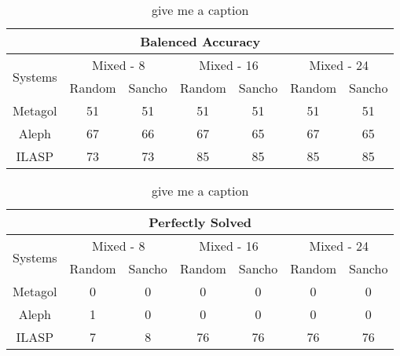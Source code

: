 \begin{table}[]
	\begin{tabular}{|c|c|c|c|c|c|c|}
		\hline
		\multicolumn{7}{|c|}{Balenced Accuracy}                                                                                       \\ \hline
		\multirow{2}{*}{Systems} & \multicolumn{2}{c|}{Mixed - 8} & \multicolumn{2}{c|}{Mixed - 16} & \multicolumn{2}{c|}{Mixed - 24} \\ \cline{2-7}
		& Random         & Sancho        & Random         & Sancho         & Random         & Sancho         \\ \hline
		Metagol                  & 51             & 51            & 51             & 51             & 51             & 51             \\ \hline
		Aleph                    & 67             & 66            & 67             & 65             & 67             & 65             \\ \hline
		ILASP                    & 73             & 73            & 85             & 85             & 85             & 85             \\ \hline
	\end{tabular}
	\label{givemeaname}
	\caption{\ac{give me a caption}}
\end{table}

\begin{table}[]
	\begin{tabular}{|c|c|c|c|c|c|c|}
		\hline
		\multicolumn{7}{|c|}{Perfectly Solved}                                                                                        \\ \hline
		\multirow{2}{*}{Systems} & \multicolumn{2}{c|}{Mixed - 8} & \multicolumn{2}{c|}{Mixed - 16} & \multicolumn{2}{c|}{Mixed - 24} \\ \cline{2-7}
		& Random         & Sancho        & Random         & Sancho         & Random         & Sancho         \\ \hline
		Metagol                  & 0              & 0             & 0              & 0              & 0              & 0              \\ \hline
		Aleph                    & 1              & 0             & 0              & 0              & 0              & 0              \\ \hline
		ILASP                    & 7              & 8             & 76             & 76             & 76             & 76             \\ \hline
	\end{tabular}
	\label{givemeaname}
	\caption{\ac{give me a caption}}
\end{table}

